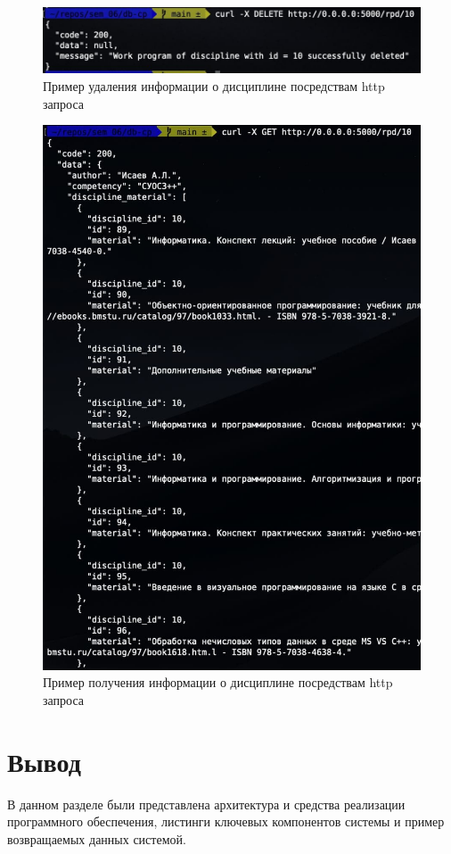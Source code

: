\begin{figure}[h!]
	\begin{center}
		\includegraphics[scale=0.65]{img/delete_example.jpg}
	\end{center}
	\captionsetup{justification=centering}
	\caption{Пример удаления информации о дисциплине посредствам http запроса}
	\label{img:delete-example}
\end{figure}


\begin{figure}[h!]
	\begin{center}
		\includegraphics[scale=0.6]{img/get_example.jpg}
	\end{center}
	\captionsetup{justification=centering}
	\caption{Пример получения информации о дисциплине посредствам http запроса}
	\label{img:get-example}
\end{figure}


\section*{Вывод}

В данном разделе были представлена архитектура и средства реализации программного обеспечения, листинги ключевых компонентов системы и пример возвращаемых данных системой.